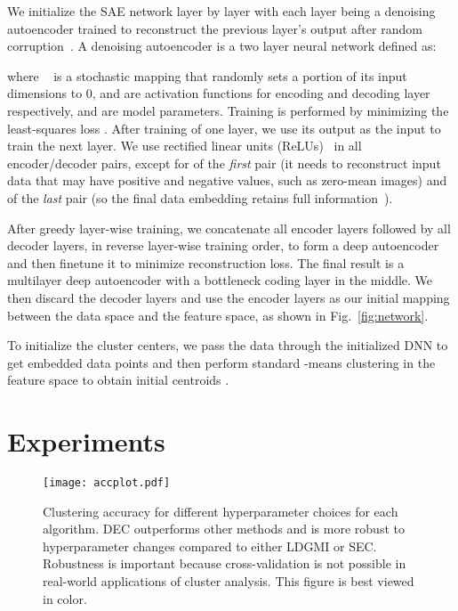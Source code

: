 \documentclass{article}
\begin{document}
We initialize the SAE network layer by layer with each layer being a denoising autoencoder
trained to reconstruct the previous layer's output after random
corruption~\citep{vincent2010stacked}. A denoising autoencoder is a two layer neural network defined as:

where ~\citep{srivastava2014dropout} is a stochastic mapping that randomly sets a portion of its input dimensions to 0,  and  are activation functions for encoding and decoding layer respectively, and  are model parameters. Training is performed by minimizing the least-squares loss . After training of one layer, we use its output  as the input to train the next layer.
We use rectified linear units (ReLUs)~\citep{nair2010rectified} in all encoder/decoder pairs, except for  of the \emph{first} pair (it needs to reconstruct input data that may have positive and negative values, such as zero-mean images) and  of the \emph{last} pair (so the final data embedding retains full information~\citep{vincent2010stacked}).

After greedy layer-wise training, we concatenate all encoder layers followed by all decoder layers, in reverse layer-wise training order, to form a deep autoencoder and then finetune it to minimize reconstruction loss. The final result is a multilayer deep autoencoder with a bottleneck coding layer in the middle. We then discard the decoder layers and use the encoder layers as our initial mapping between the data space and the feature space, as shown in Fig.~\ref{fig:network}.

To initialize the cluster centers, we pass the data through the initialized DNN to get embedded data points and then perform standard -means clustering in the feature space  to obtain  initial centroids .
 \section{Experiments}

\begin{figure*}[!ht]
\texttt{[image: accplot.pdf]}
\caption{Clustering accuracy for different hyperparameter choices for each algorithm.
DEC outperforms other methods and is more robust to hyperparameter changes compared to either LDGMI or SEC.
Robustness is important because cross-validation is not possible in real-world applications of cluster analysis. This figure is best viewed in color.}
\label{fig:acc}
\end{figure*}
\end{document}
